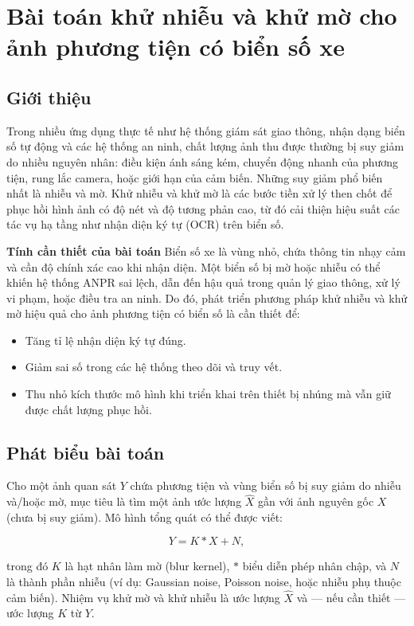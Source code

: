 
\chapter{Bài toán khử nhiễu và khử mờ cho ảnh phương tiện có biển số xe}

\section{Giới thiệu}
Trong nhiều ứng dụng thực tế như hệ thống giám sát giao thông, nhận dạng biển số tự động và các hệ thống an ninh, chất lượng ảnh thu được thường bị suy giảm do nhiều nguyên nhân: điều kiện ánh sáng kém, chuyển động nhanh của phương tiện, rung lắc camera, hoặc giới hạn của cảm biến. Những suy giảm phổ biến nhất là nhiễu  và mờ. Khử nhiễu và khử mờ là các bước tiền xử lý then chốt để phục hồi hình ảnh có độ nét và độ tương phản cao, từ đó cải thiện hiệu suất các tác vụ hạ tầng như nhận diện ký tự (OCR) trên biển số.

\textbf{Tính cần thiết của bài toán}
Biển số xe là vùng nhỏ, chứa thông tin nhạy cảm và cần độ chính xác cao khi nhận diện. Một biển số bị mờ hoặc nhiễu có thể khiến hệ thống ANPR sai lệch, dẫn đến hậu quả trong quản lý giao thông, xử lý vi phạm, hoặc điều tra an ninh. Do đó, phát triển phương pháp khử nhiễu và khử mờ hiệu quả cho ảnh phương tiện có biển số là cần thiết để:
\begin{itemize}
\item Tăng tỉ lệ nhận diện ký tự đúng.
\item Giảm sai số trong các hệ thống theo dõi và truy vết.
\item Thu nhỏ kích thước mô hình khi triển khai trên thiết bị nhúng mà vẫn giữ được chất lượng phục hồi.
\end{itemize}

\section{Phát biểu bài toán}
Cho một ảnh quan sát $Y$ chứa phương tiện và vùng biển số bị suy giảm do nhiễu và/hoặc mờ, mục tiêu là tìm một ảnh ước lượng $\hat{X}$ gần với ảnh nguyên gốc $X$ (chưa bị suy giảm). Mô hình tổng quát có thể được viết:

\begin{equation}
Y = K * X + N,
\end{equation}

trong đó $K$ là hạt nhân làm mờ (blur kernel), $*$ biểu diễn phép nhân chập, và $N$ là thành phần nhiễu (ví dụ: Gaussian noise, Poisson noise, hoặc nhiễu phụ thuộc cảm biến). Nhiệm vụ khử mờ và khử nhiễu là ước lượng $\hat{X}$ và — nếu cần thiết — ước lượng $K$ từ $Y$.

